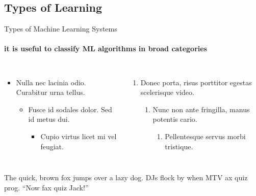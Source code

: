 \documentclass{beamer}
\begin{document}
    \subsection{Types of Learning}
    \begin{frame}[label=lists]{Types of Machine Learning Systems}
      \framesubtitle{it is useful to classify ML algorithms in broad categories}
      \begin{columns}[onlytextwidth]
          \begin{itemize}
            \item Nulla nec lacinia odio. Curabitur urna tellus.
            \begin{itemize}
              \item Fusce id sodales dolor. Sed id metus dui.
              \begin{itemize}
                \item Cupio virtus licet mi vel feugiat.
              \end{itemize}
            \end{itemize}
          \end{itemize}
          \begin{enumerate}
            \item Donec porta, risus porttitor egestas scelerisque video.
            \begin{enumerate}
              \item Nunc non ante fringilla, manus potentis cario.
              \begin{enumerate}
                \item Pellentesque servus morbi tristique.
              \end{enumerate}
            \end{enumerate}
          \end{enumerate}
      \end{columns}
      \bigskip
      \justifying
      {The quick, brown fox jumps over a lazy
      dog. DJs flock by when MTV ax quiz prog. “Now fax quiz Jack!”}
    \end{frame} 
\end{document}
